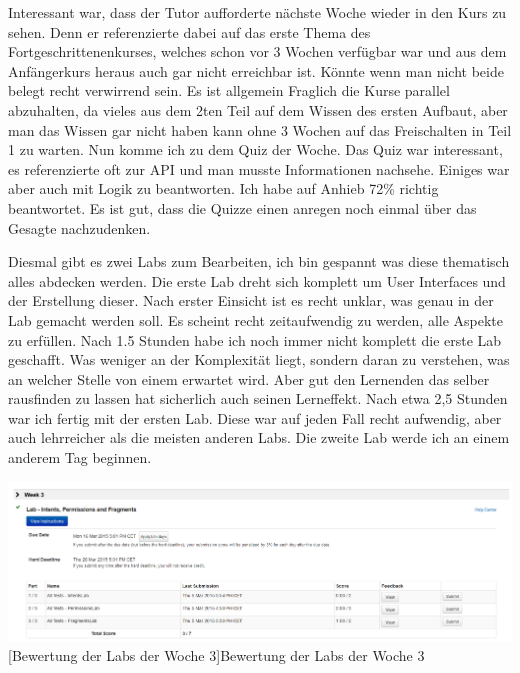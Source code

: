 \documentclass[12pt,a4paper,bibliography=totocnumbered,listof=totocnumbered]{scrartcl}
\begin{document}
Interessant war, dass der Tutor aufforderte nächste Woche wieder in den Kurs zu sehen. Denn er referenzierte dabei auf das erste Thema des Fortgeschrittenenkurses, welches schon vor 3 Wochen verfügbar war und aus dem Anfängerkurs heraus auch gar nicht erreichbar ist. Könnte wenn man nicht beide belegt recht verwirrend sein. Es ist allgemein Fraglich die Kurse parallel abzuhalten, da vieles aus dem 2ten Teil auf dem Wissen des ersten Aufbaut, aber man das Wissen gar nicht haben kann ohne 3 Wochen auf das Freischalten in Teil 1 zu warten. 
Nun komme ich zu dem Quiz der Woche. 
Das Quiz war interessant, es referenzierte oft zur API und man musste Informationen nachsehe. Einiges war aber auch mit Logik zu beantworten. Ich habe auf Anhieb 72\% richtig beantwortet. Es ist gut, dass die Quizze einen anregen noch einmal über das Gesagte nachzudenken. 

Diesmal gibt es zwei Labs zum Bearbeiten, ich bin gespannt was diese thematisch alles abdecken werden. 
Die erste Lab dreht sich komplett um User Interfaces und der Erstellung dieser. Nach erster Einsicht ist es recht unklar, was genau in der Lab gemacht werden soll. Es scheint recht zeitaufwendig zu werden, alle Aspekte zu erfüllen. Nach 1.5 Stunden habe ich noch immer nicht komplett die erste Lab geschafft. Was weniger an der Komplexität liegt, sondern daran zu verstehen, was an welcher Stelle von einem erwartet wird. Aber gut den Lernenden das selber rausfinden zu lassen hat sicherlich auch seinen Lerneffekt. Nach etwa 2,5 Stunden war ich fertig mit der ersten Lab. Diese war auf jeden Fall recht aufwendig, aber auch lehrreicher als die meisten anderen Labs. 
Die zweite Lab werde ich an einem anderem Tag beginnen. 

\vspace{1em}
\begin{minipage}{\linewidth}
	\centering
	\includegraphics[width=1\linewidth]{Bilder/bewertung.png}
	[Bewertung der Labs der Woche 3]{Bewertung der Labs der Woche 3\footnotemark }
	\label{fig:osgi}
\end{minipage}
\end{document}
